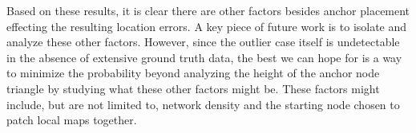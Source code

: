 Based on these results, it is clear there are other factors besides anchor placement effecting the resulting location errors. A key piece of future work is to isolate and analyze these other factors.  However, since the outlier case itself is undetectable in the absence of extensive ground truth data, the best we can hope for is a way to minimize the probability beyond analyzing the height of the anchor node triangle by studying what these other factors might be.  These factors might include, but are not limited to, network density and the starting node chosen to patch local maps together.

